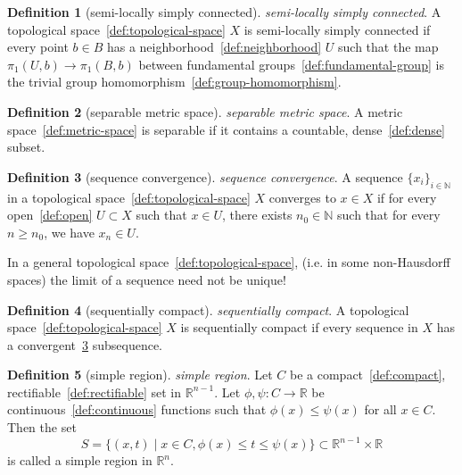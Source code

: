 \documentclass[12pt,a4paper]{article}
\theoremstyle{definition}
\newtheorem{definition}{Definition}
\begin{document}
\begin{definition}[semi-locally simply connected]\label{def:semi-locally-simply-connected}
\emph{semi-locally simply connected}. A topological space~\ref{def:topological-space} $X$ is semi-locally simply connected if every point $b\in B$ has a neighborhood~\ref{def:neighborhood} $U$ such that the map $\pi_1(U,b)\to \pi_1(B,b)$ between fundamental groups~\ref{def:fundamental-group} is the trivial group homomorphism~\ref{def:group-homomorphism}.
\end{definition}

\begin{definition}[separable metric space]\label{def:separable-metric-space}
\emph{separable metric space}. A metric space~\ref{def:metric-space} is separable if it contains a countable, dense~\ref{def:dense} subset.
\end{definition}

\begin{definition}[sequence convergence]\label{def:sequence-convergence}
\emph{sequence convergence}. A sequence $\{x_i\}_{i\in\mathbb N}$ in a topological space~\ref{def:topological-space} $X$ converges to $x \in X$ if for every open~\ref{def:open} $U\subset X$ such that $x \in U$, there exists $n_0 \in\mathbb N$ such that for every $n \geq n_0$, we have $x_n \in U$.

In a general topological space~\ref{def:topological-space}, (i.e. in some non-Hausdorff spaces) the limit of a sequence need not be unique!
\end{definition}

\begin{definition}[sequentially compact]\label{def:sequentially-compact}
\emph{sequentially compact}. A topological space~\ref{def:topological-space} $X$ is sequentially compact if every sequence in $X$ has a convergent~\ref{def:sequence-convergence} subsequence.
\end{definition}

\begin{definition}[simple region]\label{def:simple-region}
\emph{simple region}. Let $C$ be a compact~\ref{def:compact}, rectifiable~\ref{def:rectifiable} set in $\mathbb R^{n-1}$. Let $\phi,\psi: C \to\mathbb R$ be continuous~\ref{def:continuous} functions such that $\phi(x) \leq \psi(x)$ for all $x \in C$. Then the set $$S = \{(x,t)\mid x\in C, \phi(x) \leq t \leq \psi(x)\} \subset \mathbb R^{n-1}\times \mathbb R$$ is called a simple region in $\mathbb R^n$.
\end{definition}
\end{document}
